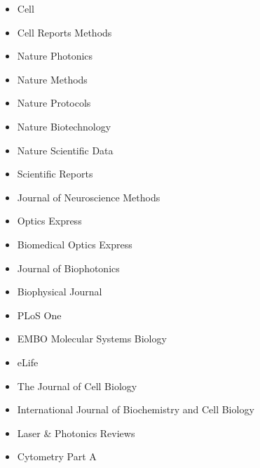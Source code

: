 \begin{itemize}
\item Cell
\item Cell Reports Methods
\item Nature Photonics
\item Nature Methods
\item Nature Protocols
\item Nature Biotechnology
\item Nature Scientific Data
\item Scientific Reports
\item Journal of Neuroscience Methods
\item Optics Express
\item Biomedical Optics Express
\item Journal of Biophotonics
\item Biophysical Journal
\item PLoS One
\item EMBO Molecular Systems Biology 
\item eLife
\item The Journal of Cell Biology
\item International Journal of Biochemistry and Cell Biology
\item Laser \& Photonics Reviews
\item Cytometry Part A
\end{itemize}